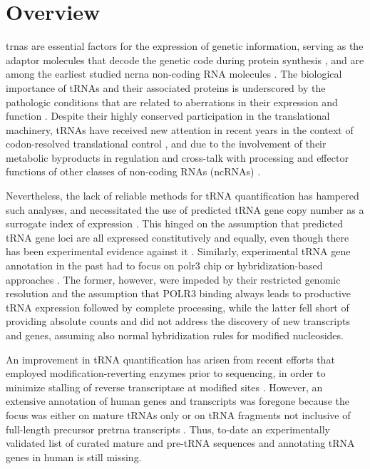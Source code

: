 \documentclass[12pt]{rockefeller}
\begin{document}
\section{Overview}
\glspl{trna} are essential factors for the expression of genetic information, serving as the adaptor molecules that decode the genetic code during protein synthesis \cite{Crick:1955}, and are among the earliest studied \gls{ncrna} non-coding RNA molecules \cite{Woese:1967, Soll:1995}. The biological importance of tRNAs and their associated proteins is underscored by the pathologic conditions that are related to aberrations in their expression and function \cite{Cooper:2009da, Park:2008gg, Griffiths:2011ge, McFarland:2004fz}.
Despite their highly conserved participation in the translational machinery, tRNAs have received new attention in recent years in the context of codon-resolved translational control \cite{Dana:2012kq,Dana:2014bs,Mahlab:2012dg,Plotkin:2010fu,Tuller:2010ge,Weinberg:2016kh}, and due to the involvement of their metabolic byproducts in regulation and cross-talk with processing and effector functions of other classes of non-coding RNAs (ncRNAs) \cite{Hasler:2016ce,Ivanov:2011iu,Lee:2009fb,Haussecker:2010hda, Babiarz:2008bs}.

Nevertheless, the lack of reliable methods for tRNA quantification has hampered such analyses, and necessitated the use of predicted tRNA gene copy number as a surrogate index of expression \cite{Iben:2014dt,Pechmann:2012ey,Tuller:2010ge}. This hinged on the assumption that predicted tRNA gene loci are all expressed constitutively and equally, even though there has been experimental evidence against it \cite{Gingold:2014iz}. Similarly, experimental tRNA gene annotation in the past had to focus on \gls{polr3} \gls{chip} \cite{Moqtaderi:2010hc, Oler:2010fb, Kutter:2011ff} or hybridization-based approaches \cite{Dittmar:2004fb, Goodarzi:2016gd}. The former, however, were impeded by their restricted genomic resolution and the assumption that POLR3 binding always leads to productive tRNA expression followed by complete processing, while the latter fell short of providing absolute counts and did not address the discovery of new transcripts and genes, assuming also normal hybridization rules for modified nucleosides.

An improvement in tRNA quantification has arisen from recent efforts that employed modification-reverting enzymes prior to sequencing, in order to minimize stalling of reverse transcriptase at modified sites \cite{Cozen:2015ds, Zheng:2015dw}. However, an extensive annotation of human genes and transcripts was foregone because the focus was either on mature tRNAs only \cite{Zheng:2015dw} or on tRNA fragments not inclusive of full-length precursor \gls{pretrna} transcripts \cite{Cozen:2015ds}. Thus, to-date an experimentally validated list of curated mature and pre-tRNA sequences and annotating tRNA genes in human is still missing.
\end{document}

